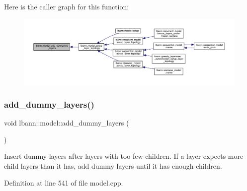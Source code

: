 Here is the caller graph for this function\+:\nopagebreak
\begin{figure}[H]
\begin{center}
\leavevmode
\includegraphics[width=350pt]{classlbann_1_1model_a3fb0304e6426dd28a436f50559ef2bef_icgraph}
\end{center}
\end{figure}
\mbox{\label{classlbann_1_1model_a6ba9a836e5ba52c999c5234cfa5e62c2}} 
\subsubsection{\texorpdfstring{add\+\_\+dummy\+\_\+layers()}{add\_dummy\_layers()}}
{\footnotesize\ttfamily void lbann\+::model\+::add\+\_\+dummy\+\_\+layers (\begin{DoxyParamCaption}{ }\end{DoxyParamCaption})\hspace{0.3cm}{\ttfamily [private]}}

Insert dummy layers after layers with too few children. If a layer expects more child layers than it has, add dummy layers until it has enough children. 

Definition at line 541 of file model.\+cpp.



